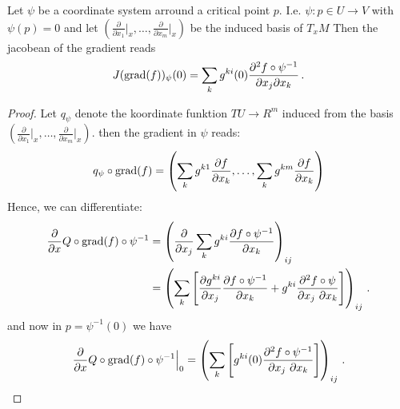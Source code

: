 \begin{lemma}
	Let $\psi$ be a coordinate system arround a critical point $p$. I.e. $\psi: p\in U\to V$ with $\psi(p)=0$ and let $\left( \frac{\partial}{\partial x_1}\big|_x,\dots ,\frac{\partial}{\partial x_m}\big|_x\right)$ be the induced basis of $T_xM$ Then the jacobean of the gradient reads
	\begin{equation}
			J(\mathrm{grad}(f))_\psi(0)= \sum_{k}g^{ki}(0)\frac{\partial ^2 f\circ \psi^{-1} }{\partial x_j \partial x_k} \, .
	\end{equation}
\end{lemma}
\begin{proof}
	Let $q_{\psi}$ denote the koordinate funktion $TU\to R^m$ induced from the basis $\left( \frac{\partial}{\partial x_1}\big|_x,\dots ,\frac{\partial}{\partial x_m}\big|_x\right)$. then the gradient in $\psi$ reads:
	\begin{align*}
		q_{\psi}\circ \mathrm{grad}(f)=\left(\sum_kg^{k1  }\frac{\partial f	}{\partial x_k},\dots, \sum_kg^{k m }\frac{\partial f	}{\partial x_k}\right)
	\end{align*}
	Hence, we can differentiate: 
	\begin{align*}
		\frac{\partial}{\partial x}  Q\circ \mathrm{grad}(f)\circ \psi^{-1}
		&= \left(\frac{\partial}{\partial x_j} \sum_k g^{ki}\frac{\partial f \circ \psi^{-1}}{\partial x_k}\right)_{ij} \\
		&= \left(\sum_k \left[ 
		\frac{\partial g^{ki}}{\partial x_j}\frac{\partial f \circ \psi^{-1}}{\partial x_k} +  g^{ki}\frac{\partial^2 f \circ \psi}{\partial x_j ~\partial x_k}
		\right]\right)_{ij} \, .
	\end{align*}
	and now in $p=\psi^{-1}(0)$ we have
	\begin{align*}
		\frac{\partial}{\partial x}  Q\circ \mathrm{grad}(f)\circ \psi^{-1} \Big|_{0}=\left(\sum_k \left[ 
		g^{ki}(0)\frac{\partial^2 f \circ \psi^{-1}}{\partial x_j ~\partial x_k}
		\right]\right)_{ij} \, .
	\end{align*}
\end{proof}








